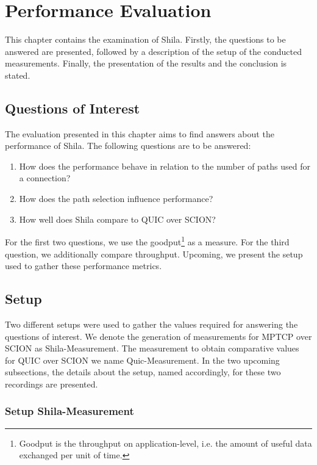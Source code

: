 \chapter{Performance Evaluation}
\label{chap:PerformanceEvaluation}

This chapter contains the examination of Shila. Firstly, the questions to be answered are presented, followed by a description of the setup of the conducted measurements. Finally, the presentation of the results and the conclusion is stated.

\section{Questions of Interest}
\label{sec:QuestionsOfInterest}

The evaluation presented in this chapter aims to find answers about the performance of Shila. The following questions are to be answered:

 \begin{enumerate}
	\item How does the performance behave in relation to the number of paths used for a connection?
	\item How does the path selection influence performance?
	\item How well does Shila compare to QUIC over SCION?
\end{enumerate}

For the first two questions, we use the goodput\footnote{Goodput is the throughput on application-level, i.e. the amount of useful data exchanged per unit of time.} as a measure. For the third question, we additionally compare throughput. Upcoming, we present the setup used to gather these performance metrics.

\section{Setup}
\label{subsec:Setup}

Two different setups were used to gather the values required for answering the questions of interest. We denote the generation of measurements for MPTCP over SCION as Shila-Measurement. The measurement to obtain comparative values for QUIC over SCION we name Quic-Measurement. In the two upcoming subsections, the details about the setup, named accordingly, for these two recordings are presented.

\subsection*{Setup Shila-Measurement} 

